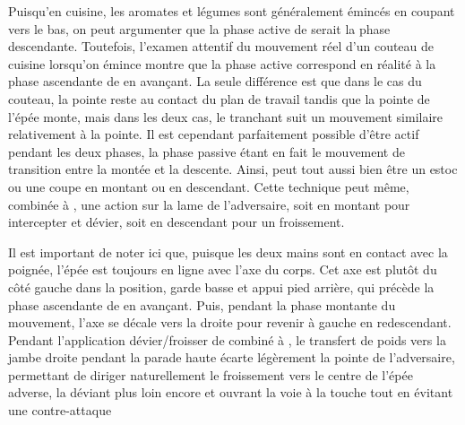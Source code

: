 Puisqu'en cuisine, les aromates et légumes sont généralement émincés en coupant vers le bas, on peut argumenter que la phase active de \Duo{} serait la phase descendante. Toutefois, l'examen attentif du mouvement réel d'un couteau de cuisine lorsqu'on émince montre que la phase active correspond en réalité à la phase ascendante de \Duo{} en avançant. La seule différence est que dans le cas du couteau, la pointe reste au contact du plan de travail tandis que la pointe de l'épée monte, mais dans les deux cas, le tranchant suit un mouvement similaire relativement à la pointe.
Il est cependant parfaitement possible d'être actif pendant les deux phases, la phase passive étant en fait le mouvement de transition entre la montée et la descente. Ainsi, \Duo{} peut tout aussi bien être un estoc ou une coupe en montant ou en descendant. Cette technique peut même, combinée à \Mo{}, une action sur la lame de l'adversaire, soit en montant pour intercepter et dévier, soit en descendant pour un froissement. 

Il est important de noter ici que, puisque les deux mains sont en contact avec la poignée, l'épée est toujours en ligne avec l'axe du corps. Cet axe est plutôt du côté gauche dans la position, garde basse et appui pied arrière, qui précède la phase ascendante de \Duo{} en avançant. Puis, pendant la phase montante du mouvement, l'axe se décale vers la droite pour revenir à gauche en redescendant. Pendant l'application dévier/froisser de \Duo{} combiné à \Mo{}, le transfert de poids vers la jambe droite pendant la parade haute écarte légèrement la pointe de l'adversaire, permettant de diriger naturellement le froissement vers le centre de l'épée adverse, la déviant plus loin encore et ouvrant la voie à la touche tout en évitant une contre-attaque


